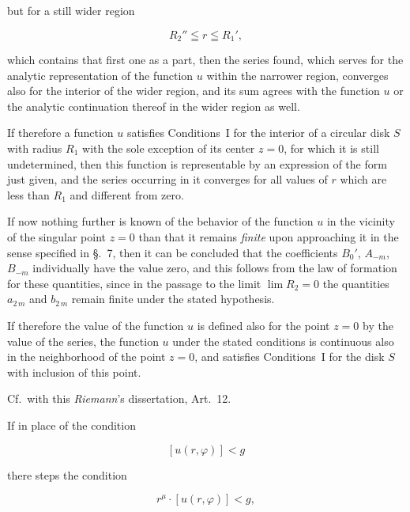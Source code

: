 \documentclass{article}
\begin{document}
but for a still wider region

\[

R_2'' \leqq r \leqq R_1',

\]

which contains that first one as a part, then the series found, which serves for the analytic representation of the function $u$ within the narrower region, converges also for the interior of the wider region, and its sum agrees with the function $u$ or the analytic continuation thereof in the wider region as well.



If therefore a function $u$ satisfies Conditions~I for the interior of a circular disk $S$ with radius $R_1$ with the sole exception of its center $z = 0$, for which it is still undetermined, then this function is representable by an expression of the form just given, and the series occurring in it converges for all values of $r$ which are less than $R_1$ and different from zero.



If now nothing further is known of the behavior of the function $u$ in the vicinity of the singular point $z = 0$ than that it remains \emph{finite} upon approaching it in the sense specified in §.~7, then it can be concluded that the coefficients $B_0'$, $A_{-m}$, $B_{-m}$ individually have the value zero, and this follows from the law of formation for these quantities, since in the passage to the limit $\lim R_2 = 0$ the quantities $a_{2\,m}$ and $b_{2\,m}$ remain finite under the stated hypothesis.



If therefore the value of the function $u$ is defined also for the point $z = 0$ by the value of the series, the function $u$ under the stated conditions is continuous also in the neighborhood of the point $z = 0$, and satisfies Conditions~I for the disk $S$ with inclusion of this point.



Cf.~with this \emph{Riemann}'s dissertation, Art.~12.




If in place of the condition

\[

[u(r, \varphi)] < g

\]

there steps the condition

\[

r^\mu \cdot [u(r, \varphi)] < g,

\]
\end{document}
